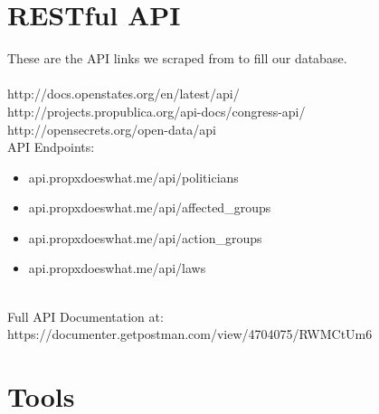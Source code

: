 \documentclass[12pt]{article}
\begin{document}
\section{RESTful API}
These are the API links we scraped from to fill our database.\\ \\http://docs.openstates.org/en/latest/api/ \\http://projects.propublica.org/api-docs/congress-api/ \\http://opensecrets.org/open-data/api\\

API Endpoints: \\

\begin{itemize}
	\item api.propxdoeswhat.me/api/politicians
	\item api.propxdoeswhat.me/api/affected\_groups
	\item api.propxdoeswhat.me/api/action\_groups
	\item api.propxdoeswhat.me/api/laws
\end{itemize}

~\\
Full API Documentation at:\\ https://documenter.getpostman.com/view/4704075/RWMCtUm6

\section{Tools}
\end{document}
